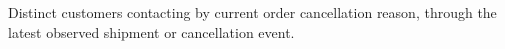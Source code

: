 Distinct customers contacting by current order cancellation reason, through the latest observed shipment or cancellation event.
